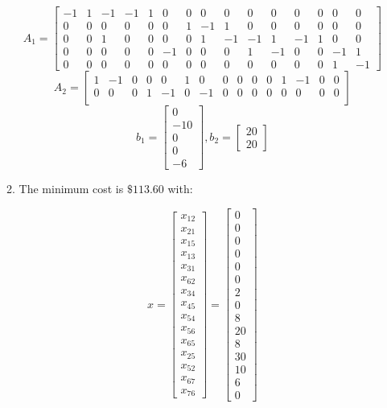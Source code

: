 \documentclass{article}
\begin{document}
\begin{enumerate}
\begin{enumerate}
$$
A_1 = \begin{bmatrix}
-1 &1& -1& -1 &1 &0 &0& 0 &0& 0 &0& 0& 0 &0& 0 \\
0& 0 &0&0& 0& 0& 1& -1& 1 &0 &0 &0& 0 &0 &0 \\
0 &0 &1 &0 &0 &0 &0 &1 &-1 &-1& 1 &-1& 1 &0 &0 \\
0 &0 &0 &0 &0 &-1& 0 &0&0 &1& -1& 0 &0 &-1&1 \\
0& 0 &0 &0 &0& 0 &0 &0 &0 &0& 0 &0 &0& 1&-1
\end{bmatrix}
$$
$$
A_2 = \begin{bmatrix}
1 &-1 &0& 0& 0& 1& 0 &0 &0& 0 &0 &1&-1 &0 &0 \\
0 &0 &0& 1& -1 &0 &-1 &0& 0& 0 &0 &0& 0 &0 &0 \\
\end{bmatrix}
$$
$$
b_1 = \begin{bmatrix}
0 \\
-10 \\
0 \\
0 \\
-6
\end{bmatrix},
b_2 = 
\begin{bmatrix}
20 \\
20
\end{bmatrix}
$$


\item The minimum cost is $\$113.60$ with:

$$
x = \begin{bmatrix}
x_{12} \\
x_{21} \\
x_{15} \\
x_{13} \\
x_{31} \\
x_{62} \\
x_{34} \\
x_{45} \\
x_{54} \\
x_{56} \\
x_{65} \\
x_{25} \\
x_{52} \\
x_{67} \\
x_{76}
\end{bmatrix}
= 
\begin{bmatrix}
0 \\
0 \\
0 \\
0 \\
0 \\
0 \\
2 \\
0 \\
8 \\
20 \\
8 \\
30 \\
10 \\
6 \\
0
\end{bmatrix}
$$
\end{enumerate}


\end{enumerate}
\end{document}
